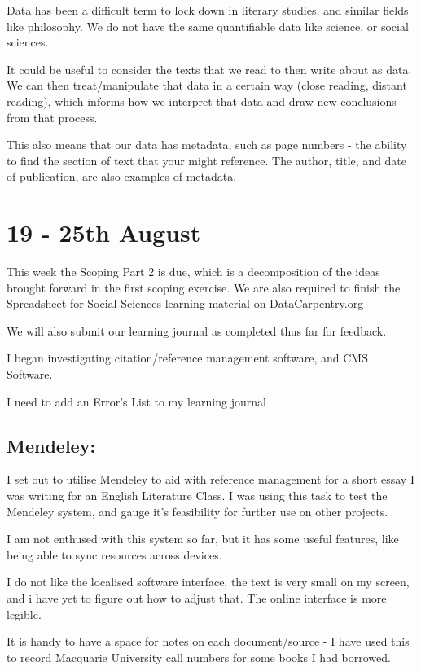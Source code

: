\documentclass{article}
\begin{document}
Data has been a difficult term to lock down in literary studies, and similar fields like philosophy. We do not have the same quantifiable data like science, or social sciences. 

It could be useful to consider the texts that we read to then write about as data. We can then treat/manipulate that data in a certain way (close reading, distant reading), which informs how we interpret that data and draw new conclusions from that process. 

This also means that our data has metadata, such as page numbers - the ability to find the section of text that your might reference. The author, title, and date of publication, are also examples of metadata.

\section{19 - 25th August}

This week the Scoping Part 2 is due, which is a decomposition of the ideas brought forward in the first scoping exercise. 
We are also required to finish the Spreadsheet for Social Sciences learning material on DataCarpentry.org

We will also submit our learning journal as completed thus far for feedback. 

I began investigating citation/reference management software, and CMS Software. 

I need to add an Error's List to my learning journal

\subsection{Mendeley:}
I set out to utilise Mendeley to aid with reference management for a short essay I was writing for an English Literature Class. 
I was using this task to test the Mendeley system, and gauge it's feasibility for further use on other projects. 

I am not enthused with this system so far, but it has some useful features, like being able to sync resources across devices. 

I do not like the localised software interface, the text is very small on my screen, and i have yet to figure out how to adjust that. The online interface is more legible. 

It is handy to have a space for notes on each document/source - I have used this to record Macquarie University call numbers for some books I had borrowed. 
\end{document}
